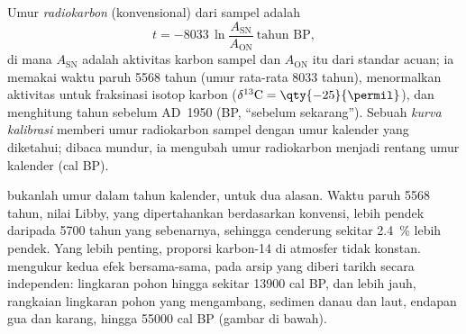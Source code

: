 \begin{definition}\label{def:b1:radiometric-methods:radiocarbon}
Umur \emph{radiokarbon} (konvensional) dari sampel adalah
\[
  t = -8033 \,\ln \frac{A_{\mathrm{SN}}}{A_{\mathrm{ON}}} \ \text{tahun BP},
\]
di mana $A_{\mathrm{SN}}$ adalah aktivitas karbon sampel dan
$A_{\mathrm{ON}}$ itu dari standar acuan; ia memakai waktu paruh \num{5568} tahun (umur rata-rata \num{8033} tahun), menormalkan aktivitas untuk fraksinasi isotop karbon ($\delta^{13}\mathrm{C} = \qty{-25}{\permil}$), dan menghitung tahun sebelum AD~1950 (BP, ``sebelum sekarang''). Sebuah \emph{kurva kalibrasi} memberi umur radiokarbon sampel dengan umur kalender yang diketahui; dibaca mundur, ia mengubah umur radiokarbon menjadi rentang umur kalender (cal BP).
\end{definition}

 bukanlah umur dalam tahun kalender, untuk dua alasan. Waktu paruh \num{5568} tahun, nilai Libby, yang dipertahankan berdasarkan konvensi, lebih pendek daripada \num{5700} tahun yang sebenarnya, sehingga  cenderung sekitar \qty{2.4}{\percent} lebih pendek. Yang lebih penting, proporsi karbon-14 di atmosfer tidak konstan.  mengukur kedua efek bersama-sama, pada arsip yang diberi tarikh secara independen: lingkaran pohon hingga sekitar \num{13900} cal BP, dan lebih jauh, rangkaian lingkaran pohon yang mengambang, sedimen danau dan laut, endapan gua dan karang, hingga \num{55000} cal BP (gambar di bawah).

